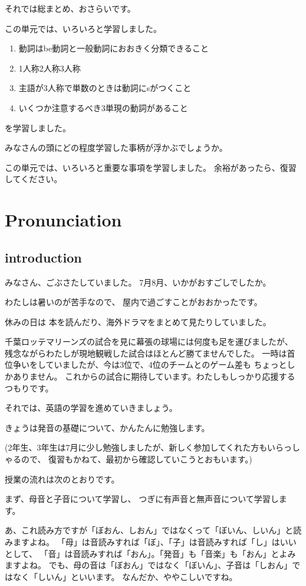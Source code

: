 \documentclass[book,jafontscale=0.9247]{jlreq}
\begin{document}
それでは総まとめ、おさらいです。

この単元では、いろいろと学習しました。

\begin{enumerate}
 \item 動詞はbe動詞と一般動詞におおきく分類できること
 \item 1人称2人称3人称
 \item 主語が3人称で単数のときは動詞にsがつくこと
 \item いくつか注意するべき3単現の動詞があること
\end{enumerate}
を学習しました。

みなさんの頭にどの程度学習した事柄が浮かぶでしょうか。

この単元では、いろいろと重要な事項を学習しました。
余裕があったら、復習してください。

\chapter{Pronunciation}
\section{introduction}

みなさん、ごぶさたしていました。
7月8月、いかがおすごしでしたか。

わたしは暑いのが苦手なので、
屋内で過ごすことがおおかったです。

休みの日は
本を読んだり、海外ドラマをまとめて見たりしていました。

千葉ロッテマリーンズの試合を見に幕張の球場には何度も足を運びましたが、
残念ながらわたしが現地観戦した試合はほとんど勝てませんでした。
一時は首位争いをしていましたが、今は3位で、4位のチームとのゲーム差も
ちょっとしかありません。
これからの試合に期待しています。わたしもしっかり応援するつもりです。

それでは、英語の学習を進めていきましょう。

きょうは発音の基礎について、かんたんに勉強します。

(2年生、3年生は7月に少し勉強しましたが、新しく参加してくれた方もいらっしゃるので、
復習もかねて、最初から確認していこうとおもいます。)


授業の流れは次のとおりです。

まず、母音と子音について学習し、
つぎに有声音と無声音について学習します。

あ、これ読み方ですが「ぼおん、しおん」ではなくって「ぼいん、しいん」と読みますよね。
「母」は音読みすれば「ぼ」、「子」は音読みすれば「し」はいいとして、
「音」は音読みすれば「おん」。「発音」も「音楽」も「おん」とよみますよね。
でも、母の音は「ぼおん」ではなく「ぼいん」、子音は「しおん」ではなく「しいん」といいます。
なんだか、ややこしいですね。
\end{document}
